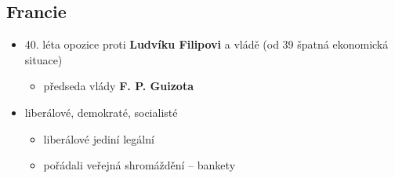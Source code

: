 \subsection{Francie}
\begin{itemize}
\item 40. léta opozice proti \textbf{Ludvíku Filipovi} a vládě (od 39 špatná ekonomická situace)
	\begin{itemize}
	\item předseda vlády \textbf{F. P. Guizota}
	\end{itemize}
\item liberálové, demokraté, socialisté
	\begin{itemize}
	\item liberálové jediní legální
	\item pořádali veřejná shromáždění -- bankety
	\end{itemize}
\end{itemize}

